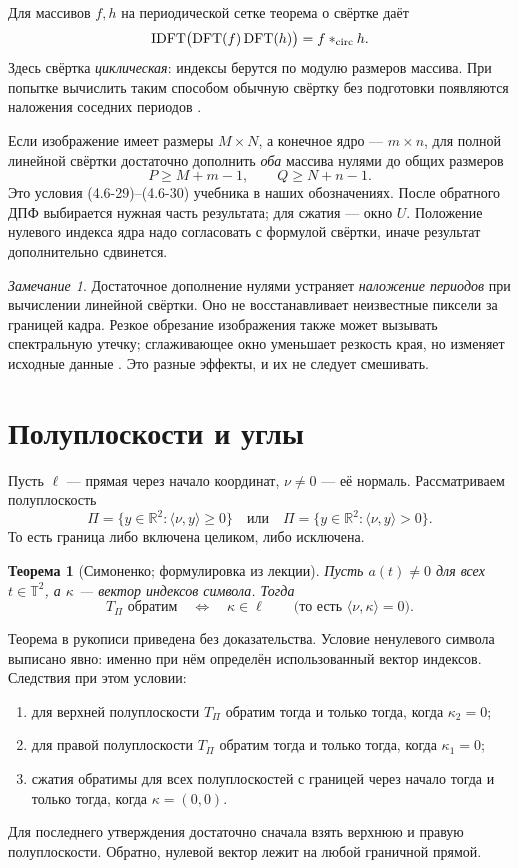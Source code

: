 \documentclass[12pt,a4paper]{article}
\newtheorem{theorem}{Теорема}
\theoremstyle{definition}
\theoremstyle{remark}
\newtheorem*{remark}{Замечание}
\newcommand{\RR}{\mathbb{R}}
\newcommand{\TT}{\mathbb T}
\begin{document}
Для массивов $f,h$ на периодической сетке теорема о свёртке даёт
\[
  \operatorname{IDFT}\bigl(\operatorname{DFT}(f)
       \operatorname{DFT}(h)\bigr)=f*_{\rm circ}h.
\]
Здесь свёртка \emph{циклическая}: индексы берутся по модулю
размеров массива. При попытке вычислить таким способом обычную
свёртку без подготовки появляются наложения соседних периодов
\cite[\S\,4.6.6, с.~298--301]{GW2012}.

Если изображение имеет размеры $M\times N$, а конечное ядро ---
$m\times n$, для полной линейной свёртки достаточно дополнить
\emph{оба} массива нулями до общих размеров
\[
  \boxed{P\geqslant M+m-1,\qquad Q\geqslant N+n-1}.
\]
Это условия (4.6-29)--(4.6-30) учебника в наших обозначениях.
После обратного ДПФ выбирается нужная часть результата; для
сжатия --- окно $U$. Положение нулевого индекса ядра надо согласовать
с формулой свёртки, иначе результат дополнительно сдвинется.

\begin{remark}
Достаточное дополнение нулями устраняет \emph{наложение периодов}
при вычислении линейной свёртки. Оно не восстанавливает неизвестные
пиксели за границей кадра. Резкое обрезание изображения также
может вызывать спектральную утечку; сглаживающее окно уменьшает
резкость края, но изменяет исходные данные
\cite[\S\,4.6.6, с.~301, 304]{GW2012}.
Это разные эффекты, и их не следует смешивать.
\end{remark}

\section{Полуплоскости и углы}

Пусть $\ell$ --- прямая через начало координат, $\nu\ne0$ ---
её нормаль. Рассматриваем полуплоскость
\[
  \Pi=\{y\in\RR^2:\langle\nu,y\rangle\geqslant0\}
  \quad\text{или}\quad
  \Pi=\{y\in\RR^2:\langle\nu,y\rangle>0\}.
\]
То есть граница либо включена целиком, либо исключена.

\begin{theorem}[Симоненко; формулировка из лекции]
Пусть $a(t)\ne0$ для всех $t\in\TT^2$, а $\kappa$ --- вектор
индексов символа. Тогда
\[
  \boxed{T_\Pi\text{ обратим}\quad\Longleftrightarrow\quad
  \kappa\in\ell}
  \qquad\bigl(\text{то есть }\langle\nu,\kappa\rangle=0\bigr).
\]
\end{theorem}

Теорема в рукописи приведена без доказательства. Условие
ненулевого символа выписано явно: именно при нём определён
использованный вектор индексов. Следствия при этом условии:
\begin{enumerate}
  \item для верхней полуплоскости $T_\Pi$ обратим
        тогда и только тогда, когда $\kappa_2=0$;
  \item для правой полуплоскости $T_\Pi$ обратим
        тогда и только тогда, когда $\kappa_1=0$;
  \item сжатия обратимы для всех полуплоскостей с границей
        через начало тогда и только тогда, когда $\kappa=(0,0)$.
\end{enumerate}
Для последнего утверждения достаточно сначала взять верхнюю
и правую полуплоскости. Обратно, нулевой вектор лежит на любой
граничной прямой.
\end{document}
